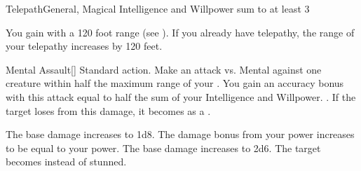     \begin{magicalfeat}{Telepath}{General, Magical}
        \featpre Intelligence and Willpower sum to at least 3

         You gain  with a 120 foot range (see ).
        If you already have telepathy, the range of your telepathy increases by 120 feet.

        \begin{magicalactiveability}{Mental Assault}[]
            \abilityusagetime Standard action.
            \rankline
            Make an attack vs. Mental against one creature within half the maximum range of your .
            You gain an accuracy bonus with this attack equal to half the sum of your Intelligence and Willpower.
            \hit {}.
            If the target loses  from this damage, it becomes \stunned as a .

            \rankline
             The base damage increases to 1d8.
             The damage bonus from your power increases to be equal to your power.
             The base damage increases to 2d6.
             The target becomes \confused instead of stunned.
        \end{magicalactiveability}


\end{magicalfeat}
